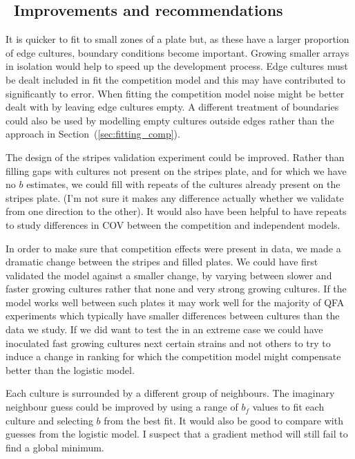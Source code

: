 \subsection{\thesubsection~Improvements and recommendations}

It is quicker to fit to small zones of a plate but, as these have a
larger proportion of edge cultures, boundary conditions become
important. Growing smaller arrays in isolation would help to speed up
the development process. Edge cultures must be dealt included in fit
the competition model and this may have contributed to significantly
to error. When fitting the competition model noise might be better
dealt with by leaving edge cultures empty. A different treatment of
boundaries could also be used by modelling empty cultures outside
edges rather than the approach in Section~(\ref{sec:fitting_comp}).



The design of the stripes validation experiment could be
improved. Rather than filling gaps with cultures not present on the
stripes plate, and for which we have no \(b\) estimates, we could fill
with repeats of the cultures already present on the stripes
plate. (I'm not sure it makes any difference actually whether we
validate from one direction to the other). It would also have been
helpful to have repeats to study differences in COV between the
competition and independent models.

In order to make sure that competition effects were present in data,
we made a dramatic change between the stripes and filled plates. We
could have first validated the model against a smaller change, by
varying between slower and faster growing cultures rather that none
and very strong growing cultures. If the model works well between such
plates it may work well for the majority of QFA experiments which
typically have smaller differences between cultures than the data we
study. If we did want to test the in an extreme case we could have
inoculated fast growing cultures next certain strains and not others
to try to induce a change in ranking for which the competition model
might compensate better than the logistic model.




Each culture is surrounded by a different group of neighbours. The
imaginary neighbour guess could be improved by using a range of
\(b_{f}\) values to fit each culture and selecting \(b\) from the best
fit. It would also be good to compare with guesses from the logistic
model. I suspect that a gradient method will still fail to find a
global minimum.



